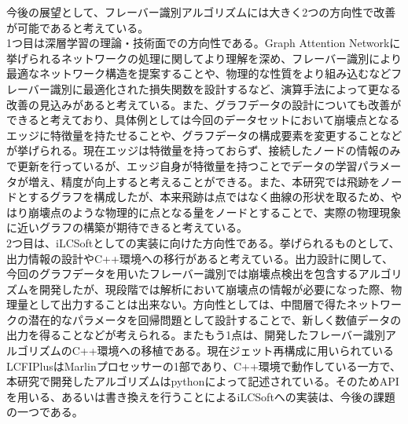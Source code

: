\hfill
今後の展望として、フレーバー識別アルゴリズムには大きく2つの方向性で改善が可能であると考えている。\\
1つ目は深層学習の理論・技術面での方向性である。Graph Attention Networkに挙げられるネットワークの処理に関してより理解を深め、フレーバー識別により最適なネットワーク構造を提案することや、物理的な性質をより組み込むなどフレーバー識別に最適化された損失関数を設計するなど、演算手法によって更なる改善の見込みがあると考えている。また、グラフデータの設計についても改善ができると考えており、具体例としては今回のデータセットにおいて崩壊点となるエッジに特徴量を持たせることや、グラフデータの構成要素を変更することなどが挙げられる。現在エッジは特徴量を持っておらず、接続したノードの情報のみで更新を行っているが、エッジ自身が特徴量を持つことでデータの学習パラメータが増え、精度が向上すると考えることができる。また、本研究では飛跡をノードとするグラフを構成したが、本来飛跡は点ではなく曲線の形状を取るため、やはり崩壊点のような物理的に点となる量をノードとすることで、実際の物理現象に近いグラフの構築が期待できると考えている。\\
2つ目は、iLCSoftとしての実装に向けた方向性である。挙げられるものとして、出力情報の設計やC++環境への移行があると考えている。出力設計に関して、今回のグラフデータを用いたフレーバー識別では崩壊点検出を包含するアルゴリズムを開発したが、現段階では解析において崩壊点の情報が必要になった際、物理量として出力することは出来ない。方向性としては、中間層で得たネットワークの潜在的なパラメータを回帰問題として設計することで、新しく数値データの出力を得ることなどが考えられる。またもう1点は、開発したフレーバー識別アルゴリズムのC++環境への移植である。現在ジェット再構成に用いられているLCFIPlusはMarlinプロセッサーの1部であり、C++環境で動作している一方で、本研究で開発したアルゴリズムはpythonによって記述されている。そのためAPIを用いる、あるいは書き換えを行うことによるiLCSoftへの実装は、今後の課題の一つである。\\
